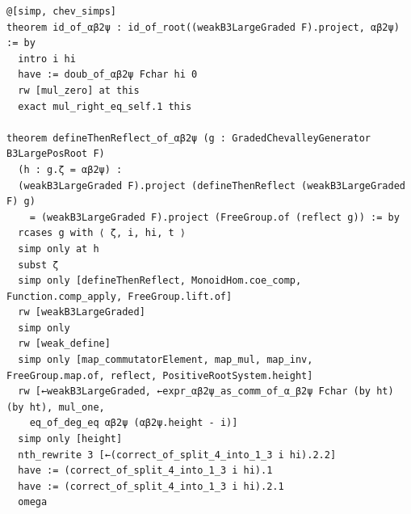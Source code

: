 \documentclass[10pt,a4paper]{article}
\begin{document}
\begin{Verbatim}
@[simp, chev_simps]
theorem id_of_αβ2ψ : id_of_root((weakB3LargeGraded F).project, αβ2ψ) := by
  intro i hi
  have := doub_of_αβ2ψ Fchar hi 0
  rw [mul_zero] at this
  exact mul_right_eq_self.1 this

theorem defineThenReflect_of_αβ2ψ (g : GradedChevalleyGenerator B3LargePosRoot F)
  (h : g.ζ = αβ2ψ) :
  (weakB3LargeGraded F).project (defineThenReflect (weakB3LargeGraded F) g)
    = (weakB3LargeGraded F).project (FreeGroup.of (reflect g)) := by
  rcases g with ⟨ ζ, i, hi, t ⟩
  simp only at h
  subst ζ
  simp only [defineThenReflect, MonoidHom.coe_comp, Function.comp_apply, FreeGroup.lift.of]
  rw [weakB3LargeGraded]
  simp only
  rw [weak_define]
  simp only [map_commutatorElement, map_mul, map_inv, FreeGroup.map.of, reflect, PositiveRootSystem.height]
  rw [←weakB3LargeGraded, ←expr_αβ2ψ_as_comm_of_α_β2ψ Fchar (by ht) (by ht), mul_one,
    eq_of_deg_eq αβ2ψ (αβ2ψ.height - i)]
  simp only [height]
  nth_rewrite 3 [←(correct_of_split_4_into_1_3 i hi).2.2]
  have := (correct_of_split_4_into_1_3 i hi).1
  have := (correct_of_split_4_into_1_3 i hi).2.1
  omega
\end{Verbatim}
\end{document}
